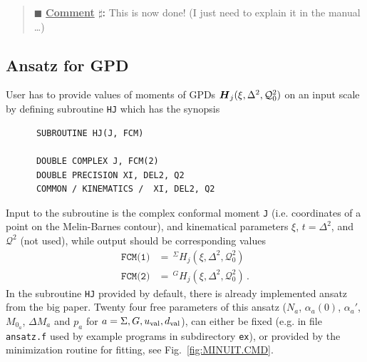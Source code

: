 \documentclass[12pt]{article}
\newcounter{comment}
\newenvironment{commblock}%
{\refstepcounter{comment}%
\begin{quote}\renewcommand{\baselinestretch}{1}
\ttfamily\small$\blacksquare$ \textbf{\underline{Comment} $\sharp$\thecomment:}}%
{\end{quote}}
\begin{document}
\begin{commblock}
This is now done! (I just need to explain it in the manual \dots)
\end{commblock}



\subsection{Ansatz for GPD}
\label{ssect:ansatz}

User has to provide values of moments of GPDs $\mbox{\boldmath $H$}_{j} 
(\xi,\Delta^2,\mathcal{Q}_{0}^2)$
on an input scale by defining subroutine \texttt{HJ} which has the synopsis
\begin{verbatim}
      SUBROUTINE HJ(J, FCM)

      DOUBLE COMPLEX J, FCM(2)
      DOUBLE PRECISION XI, DEL2, Q2
      COMMON / KINEMATICS /  XI, DEL2, Q2
\end{verbatim}
Input to the subroutine is the complex conformal moment \texttt{J} (i.e. coordinates of a point
on the Melin-Barnes contour), and kinematical parameters $\xi$, $t=\Delta^2$, and $\mathcal{Q}^2$
(not used), while output should be corresponding values
\begin{align}
\texttt{FCM(1)}& =\, ^{\Sigma}\!H_{j} (\xi,\Delta^2,\mathcal{Q}_{0}^2)  \\
\texttt{FCM(2)}& =\, ^{G}\!H_{j}(\xi,\Delta^2,\mathcal{Q}_{0}^2) \,.
\label{eq:FCM}
\end{align}
In the subroutine \texttt{HJ} provided by default, there is already implemented ansatz
from the big paper.
Twenty four free parameters of this ansatz ($N_a$, $\alpha_{a}(0)$, $\alpha_{a}'$,
$M_{0_a}$, $\Delta M_a$ and $p_a$ for  $a = \Sigma, G, u_{\rm val}, d_{\rm val}$),
can either be fixed (e.g. in file \texttt{ansatz.f} used by example programs in
subdirectory \texttt{ex}), or provided by the minimization routine for fitting, see
Fig.~\ref{fig:MINUIT.CMD}.
\end{document}
